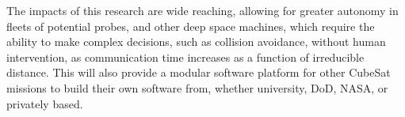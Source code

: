 The impacts of this research are wide reaching, allowing for greater
autonomy in fleets of potential probes, and other deep space machines,
which require the ability to make complex decisions, such as collision
avoidance, without human intervention, as communication time increases
as a function of irreducible distance. This will also provide a
modular software platform for other CubeSat missions to build their
own software from, whether university, DoD, NASA, or privately based.
